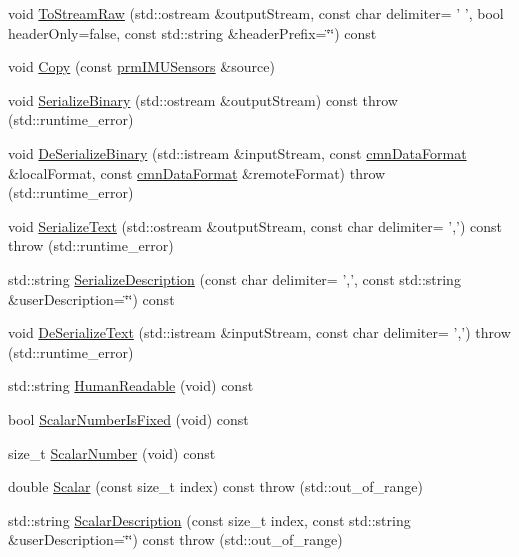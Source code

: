 \begin{DoxyCompactItemize}
\item 
void \hyperlink{classprm_i_m_u_sensors_a75b10cd21c4b82a7adb129456e62938a}{To\-Stream\-Raw} (std\-::ostream \&output\-Stream, const char delimiter= ' ', bool header\-Only=false, const std\-::string \&header\-Prefix=\char`\"{}\char`\"{}) const 
\item 
void \hyperlink{classprm_i_m_u_sensors_a1310c6835508c75054025702149dc58d}{Copy} (const \hyperlink{classprm_i_m_u_sensors}{prm\-I\-M\-U\-Sensors} \&source)
\item 
void \hyperlink{classprm_i_m_u_sensors_a8395402e8cd27634d35dcf04466a61f4}{Serialize\-Binary} (std\-::ostream \&output\-Stream) const   throw (std\-::runtime\-\_\-error)
\item 
void \hyperlink{classprm_i_m_u_sensors_a0cf392ee299c643893bfe41dc4d730e8}{De\-Serialize\-Binary} (std\-::istream \&input\-Stream, const \hyperlink{classcmn_data_format}{cmn\-Data\-Format} \&local\-Format, const \hyperlink{classcmn_data_format}{cmn\-Data\-Format} \&remote\-Format)  throw (std\-::runtime\-\_\-error)
\item 
void \hyperlink{classprm_i_m_u_sensors_a056c29b231c9b122b2660bd52797f339}{Serialize\-Text} (std\-::ostream \&output\-Stream, const char delimiter= ',') const   throw (std\-::runtime\-\_\-error)
\item 
std\-::string \hyperlink{classprm_i_m_u_sensors_ab10b64bb834cb66ec59fafd7a5d9a759}{Serialize\-Description} (const char delimiter= ',', const std\-::string \&user\-Description=\char`\"{}\char`\"{}) const 
\item 
void \hyperlink{classprm_i_m_u_sensors_a7273e28fe9be042bf2ba585c4387e936}{De\-Serialize\-Text} (std\-::istream \&input\-Stream, const char delimiter= ',')  throw (std\-::runtime\-\_\-error)
\item 
std\-::string \hyperlink{classprm_i_m_u_sensors_afec3df332aa8e5038242c5f716c2ea56}{Human\-Readable} (void) const 
\item 
bool \hyperlink{classprm_i_m_u_sensors_a5a2c0f431b9d74c4f49d13878d4f1d1b}{Scalar\-Number\-Is\-Fixed} (void) const 
\item 
size\-\_\-t \hyperlink{classprm_i_m_u_sensors_af64f52f498b69d010b9e7450dbb14b87}{Scalar\-Number} (void) const 
\item 
double \hyperlink{classprm_i_m_u_sensors_aab8891363b3f2a86ff46079bae6034ee}{Scalar} (const size\-\_\-t index) const   throw (std\-::out\-\_\-of\-\_\-range)
\item 
std\-::string \hyperlink{classprm_i_m_u_sensors_a6d38ab9085c27a700dce23ae15129f29}{Scalar\-Description} (const size\-\_\-t index, const std\-::string \&user\-Description=\char`\"{}\char`\"{}) const   throw (std\-::out\-\_\-of\-\_\-range)
\end{DoxyCompactItemize}
